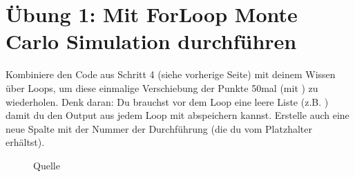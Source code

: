 \documentclass[letterpaper,10pt,english]{sphinxmanual}
\begin{document}
\section{Übung 1: Mit For\sphinxhyphen{}Loop Monte Carlo Simulation durchführen}
\label{\detokenize{03_03_Zeckenstich_Simulation:ubung-1-mit-for-loop-monte-carlo-simulation-durchfuhren}}
Kombiniere den Code aus Schritt 4 (siehe vorherige Seite) mit deinem Wissen über Loops, um diese einmalige Verschiebung der Punkte 50\sphinxhyphen{}mal (mit ) zu wiederholen. Denk daran: Du brauchst vor dem Loop eine leere Liste (z.B. ) damit du den Output aus jedem Loop mit   abspeichern kannst. Erstelle auch eine neue Spalte  mit der Nummer der Durchführung (die du vom Platzhalter erhältst).

\begin{figure}[htbp]
\centering
\capstart

\noindent{}
\caption{Quelle }\label{\detokenize{03_03_Zeckenstich_Simulation:id1}}\end{figure}



\begin{sphinxVerbatim}[commandchars=\\\{\}]
  \PYG{p}{[}\PYG{p}{]}
   
      
    \PYG{p}{[}\PYG{p}{]}  \PYG{p}{[}\PYG{p}{]}
    \PYG{p}{[}\PYG{p}{]}  \PYG{p}{[}\PYG{p}{]}
    \PYG{p}{[}\PYG{p}{]}  
\end{sphinxVerbatim}
\end{document}
